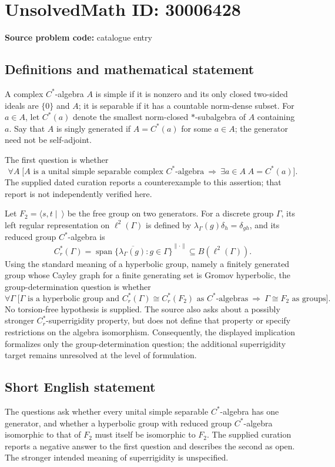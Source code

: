 \documentclass[11pt]{article}
\begin{document}
\section*{UnsolvedMath ID: 30006428}
\textbf{Source problem code:} catalogue entry
\subsection{Definitions and mathematical statement}
A complex \(C^*\)-algebra \(A\) is simple if it is nonzero and its only closed two-sided ideals are \(\{0\}\) and \(A\); it is separable if it has a countable norm-dense subset. For \(a\in A\), let \(C^*(a)\) denote the smallest norm-closed \(*\)-subalgebra of \(A\) containing \(a\). Say that \(A\) is singly generated if \(A=C^*(a)\) for some \(a\in A\); the generator need not be self-adjoint.

The first question is whether
\[
\forall A\;\bigl[A\text{ is a unital simple separable complex }C^*\text{-algebra}\ \Longrightarrow\ \exists a\in A\; A=C^*(a)\bigr].
\]
The supplied dated curation reports a counterexample to this assertion; that report is not independently verified here.

Let \(F_2=\langle s,t\mid\ \rangle\) be the free group on two generators. For a discrete group \(\Gamma\), its left regular representation on \(\ell^2(\Gamma)\) is defined by \(\lambda_\Gamma(g)\delta_h=\delta_{gh}\), and its reduced group \(C^*\)-algebra is
\[
C_r^*(\Gamma)=\overline{\operatorname{span}\{\lambda_\Gamma(g):g\in\Gamma\}}^{\|\cdot\|}\subseteq B(\ell^2(\Gamma)).
\]
Using the standard meaning of a hyperbolic group, namely a finitely generated group whose Cayley graph for a finite generating set is Gromov hyperbolic, the group-determination question is whether
\[
\forall\Gamma\;\bigl[\Gamma\text{ is a hyperbolic group and }C_r^*(\Gamma)\cong C_r^*(F_2)\text{ as }C^*\text{-algebras}\ \Longrightarrow\ \Gamma\cong F_2\text{ as groups}\bigr].
\]
No torsion-free hypothesis is supplied. The source also asks about a possibly stronger \(C_r^*\)-superrigidity property, but does not define that property or specify restrictions on the algebra isomorphism. Consequently, the displayed implication formalizes only the group-determination question; the additional superrigidity target remains unresolved at the level of formulation.
\subsection{Short English statement}
The questions ask whether every unital simple separable \(C^*\)-algebra has one generator, and whether a hyperbolic group with reduced group \(C^*\)-algebra isomorphic to that of \(F_2\) must itself be isomorphic to \(F_2\). The supplied curation reports a negative answer to the first question and describes the second as open. The stronger intended meaning of superrigidity is unspecified.
\end{document}
